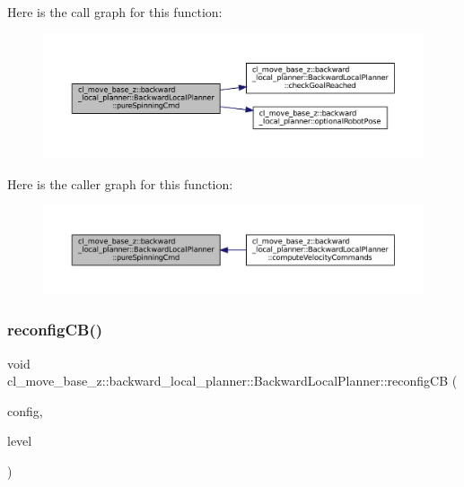 Here is the call graph for this function\+:
\nopagebreak
\begin{figure}[H]
\begin{center}
\leavevmode
\includegraphics[width=350pt]{classcl__move__base__z_1_1backward__local__planner_1_1BackwardLocalPlanner_aaa88a0a47e7cfd449c59518577599928_cgraph}
\end{center}
\end{figure}
Here is the caller graph for this function\+:
\nopagebreak
\begin{figure}[H]
\begin{center}
\leavevmode
\includegraphics[width=350pt]{classcl__move__base__z_1_1backward__local__planner_1_1BackwardLocalPlanner_aaa88a0a47e7cfd449c59518577599928_icgraph}
\end{center}
\end{figure}
\mbox{\label{classcl__move__base__z_1_1backward__local__planner_1_1BackwardLocalPlanner_a62e4783adae03ce92190d855a021b91d}} 
\subsubsection{\texorpdfstring{reconfig\+C\+B()}{reconfigCB()}}
{\footnotesize\ttfamily void cl\+\_\+move\+\_\+base\+\_\+z\+::backward\+\_\+local\+\_\+planner\+::\+Backward\+Local\+Planner\+::reconfig\+CB (\begin{DoxyParamCaption}\item[{\+::backward\+\_\+local\+\_\+planner\+::\+Backward\+Local\+Planner\+Config \&}]{config,  }\item[{uint32\+\_\+t}]{level }\end{DoxyParamCaption})\hspace{0.3cm}{\ttfamily [private]}}

